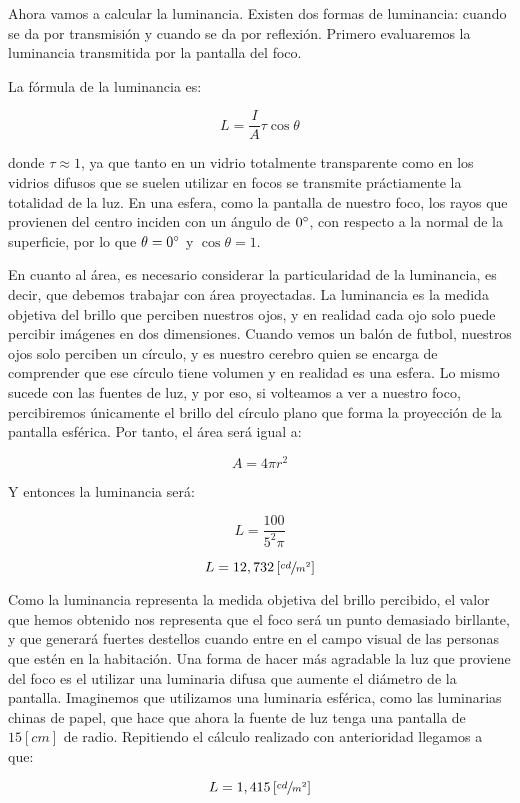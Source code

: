 \documentclass[11pt]{article}
\begin{document}
Ahora vamos a calcular la luminancia. Existen dos formas de luminancia: cuando se da por transmisión y cuando se da por reflexión. Primero evaluaremos la luminancia transmitida por la pantalla del foco.

La fórmula de la luminancia es:

\[ L = \frac{ I }{ A } \tau \cos \theta \]

donde $ \tau \approx 1 $, ya que tanto en un vidrio totalmente transparente como en los vidrios difusos que se suelen utilizar en focos se transmite práctiamente la totalidad de la luz. En una esfera, como la pantalla de nuestro foco, los rayos que provienen del centro inciden con un ángulo de $ 0 \degree $, con respecto a la normal de la superficie, por lo que $ \theta = 0 \degree $ y $ \cos \theta = 1 $. 

En cuanto al área, es necesario considerar la particularidad de la luminancia, es decir, que debemos trabajar con área proyectadas. La luminancia es la medida objetiva del brillo que perciben nuestros ojos, y en realidad cada ojo solo puede percibir imágenes en dos dimensiones. Cuando vemos un balón de futbol, nuestros ojos solo perciben un círculo, y es nuestro cerebro quien se encarga de comprender que ese círculo tiene volumen y en realidad es una esfera. Lo mismo sucede con las fuentes de luz, y por eso, si volteamos a ver a nuestro foco, percibiremos únicamente el brillo del círculo plano que forma la proyección de la pantalla esférica. Por tanto, el área será igual a:

\[ A = 4 \pi r^2 \]

Y entonces la luminancia será:

\[ L = \frac{ 100 }{ 5^2 \pi } \]

\[ L = 12, 732 \left[ \sfrac{ cd }{ m^2 } \right] \]

Como la luminancia representa la medida objetiva del brillo percibido, el valor que hemos obtenido nos representa que el foco será un punto demasiado birllante, y que generará fuertes destellos cuando entre en el campo visual de las personas que estén en la habitación. Una forma de hacer más agradable la luz que proviene del foco es el utilizar una luminaria difusa que aumente el diámetro de la pantalla. Imaginemos que utilizamos una luminaria esférica, como las luminarias chinas de papel, que hace que ahora la fuente de luz tenga una pantalla de $ 15 \left[cm \right] $ de radio. Repitiendo el cálculo realizado con anterioridad llegamos a que:

\[ L = 1, 415 \left[ \sfrac{ cd }{ m^2 } \right] \]
\end{document}
